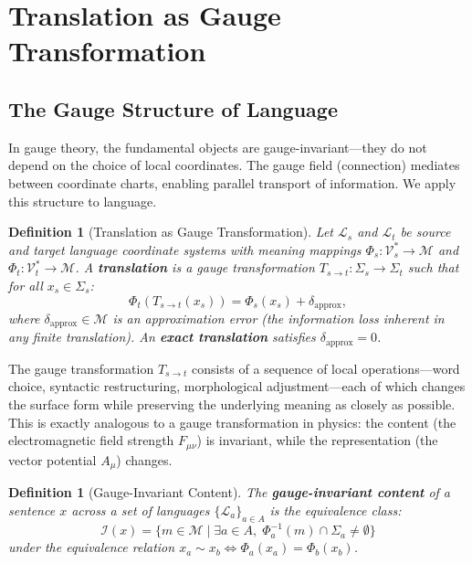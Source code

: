 \documentclass[12pt,a4paper]{article}
\newtheorem{definition}[theorem]{Definition}
\theoremstyle{remark}
\newcommand{\M}{\mathcal{M}}
\newcommand{\I}{\mathcal{I}}
\newcommand{\Lang}{\mathcal{L}}
\newcommand{\Vocab}{\mathcal{V}}
\begin{document}
\section{Translation as Gauge Transformation}
\label{sec:translation_gauge}

\subsection{The Gauge Structure of Language}

In gauge theory, the fundamental objects are gauge-invariant---they do not
depend on the choice of local coordinates. The gauge field (connection)
mediates between coordinate charts, enabling parallel transport of
information. We apply this structure to language.

\begin{definition}[Translation as Gauge Transformation]
\label{def:translation_gauge}
Let $\Lang_s$ and $\Lang_t$ be source and target language coordinate
systems with meaning mappings $\Phi_s: \Vocab_s^* \to \M$ and
$\Phi_t: \Vocab_t^* \to \M$. A \textbf{translation} is a gauge
transformation $T_{s\to t}: \Sigma_s \to \Sigma_t$ such that for
all $x_s \in \Sigma_s$:
\begin{equation}
  \label{eq:translation_gauge}
  \Phi_t(T_{s\to t}(x_s)) = \Phi_s(x_s) + \delta_{\text{approx}},
\end{equation}
where $\delta_{\text{approx}} \in \M$ is an approximation error
(the information loss inherent in any finite translation). An
\textbf{exact translation} satisfies $\delta_{\text{approx}} = 0$.
\end{definition}

The gauge transformation $T_{s\to t}$ consists of a sequence of
local operations---word choice, syntactic restructuring, morphological
adjustment---each of which changes the surface form while preserving
the underlying meaning as closely as possible. This is exactly analogous
to a gauge transformation in physics: the content (the electromagnetic
field strength $F_{\mu\nu}$) is invariant, while the representation
(the vector potential $A_\mu$) changes.

\begin{definition}[Gauge-Invariant Content]
\label{def:gauge_invariant_content}
The \textbf{gauge-invariant content} of a sentence $x$ across a
set of languages $\{\Lang_a\}_{a\in A}$ is the equivalence class:
\begin{equation}
  \label{eq:gauge_invariant}
  \I(x) = \{m \in \M \mid \exists a \in A,\; \Phi_a^{-1}(m) \cap \Sigma_a \neq \emptyset\}
\end{equation}
under the equivalence relation $x_a \sim x_b \iff \Phi_a(x_a) = \Phi_b(x_b)$.
\end{definition}
\end{document}
